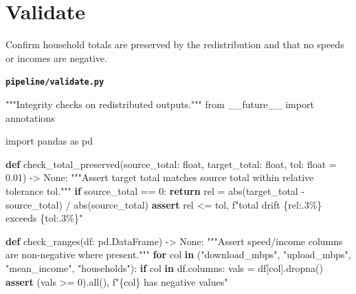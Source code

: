 \documentclass[
  letterpaper,
  DIV=11,
  numbers=noendperiod]{scrreprt}
\newenvironment{Shaded}{\begin{snugshade}}{\end{snugshade}}
\newcommand{\BuiltInTok}[1]{\textcolor[rgb]{0.00,0.23,0.31}{#1}}
\newcommand{\CommentTok}[1]{\textcolor[rgb]{0.37,0.37,0.37}{#1}}
\newcommand{\ControlFlowTok}[1]{\textcolor[rgb]{0.00,0.23,0.31}{\textbf{#1}}}
\newcommand{\DecValTok}[1]{\textcolor[rgb]{0.68,0.00,0.00}{#1}}
\newcommand{\FloatTok}[1]{\textcolor[rgb]{0.68,0.00,0.00}{#1}}
\newcommand{\ImportTok}[1]{\textcolor[rgb]{0.00,0.46,0.62}{#1}}
\newcommand{\KeywordTok}[1]{\textcolor[rgb]{0.00,0.23,0.31}{\textbf{#1}}}
\newcommand{\NormalTok}[1]{\textcolor[rgb]{0.00,0.23,0.31}{#1}}
\newcommand{\OperatorTok}[1]{\textcolor[rgb]{0.37,0.37,0.37}{#1}}
\newcommand{\SpecialCharTok}[1]{\textcolor[rgb]{0.37,0.37,0.37}{#1}}
\newcommand{\SpecialStringTok}[1]{\textcolor[rgb]{0.13,0.47,0.30}{#1}}
\newcommand{\StringTok}[1]{\textcolor[rgb]{0.13,0.47,0.30}{#1}}
\newcommand{\VariableTok}[1]{\textcolor[rgb]{0.07,0.07,0.07}{#1}}
\begin{document}
\section{Validate}\label{validate}

Confirm household totals are preserved by the redistribution and that no
speeds or incomes are negative.

\textbf{\texttt{pipeline/validate.py}}

\begin{Shaded}
\begin{Highlighting}[]
\CommentTok{"""Integrity checks on redistributed outputs."""}
\ImportTok{from}\NormalTok{ \_\_future\_\_ }\ImportTok{import}\NormalTok{ annotations}

\ImportTok{import}\NormalTok{ pandas }\ImportTok{as}\NormalTok{ pd}


\KeywordTok{def}\NormalTok{ check\_total\_preserved(source\_total: }\BuiltInTok{float}\NormalTok{, target\_total: }\BuiltInTok{float}\NormalTok{, tol: }\BuiltInTok{float} \OperatorTok{=} \FloatTok{0.01}\NormalTok{) }\OperatorTok{{-}\textgreater{}} \VariableTok{None}\NormalTok{:}
    \CommentTok{"""Assert target total matches source total within relative tolerance \textasciigrave{}\textasciigrave{}tol\textasciigrave{}\textasciigrave{}."""}
    \ControlFlowTok{if}\NormalTok{ source\_total }\OperatorTok{==} \DecValTok{0}\NormalTok{:}
        \ControlFlowTok{return}
\NormalTok{    rel }\OperatorTok{=} \BuiltInTok{abs}\NormalTok{(target\_total }\OperatorTok{{-}}\NormalTok{ source\_total) }\OperatorTok{/} \BuiltInTok{abs}\NormalTok{(source\_total)}
    \ControlFlowTok{assert}\NormalTok{ rel }\OperatorTok{\textless{}=}\NormalTok{ tol, }\SpecialStringTok{f"total drift }\SpecialCharTok{\{}\NormalTok{rel}\SpecialCharTok{:.3\%\}}\SpecialStringTok{ exceeds }\SpecialCharTok{\{}\NormalTok{tol}\SpecialCharTok{:.3\%\}}\SpecialStringTok{"}


\KeywordTok{def}\NormalTok{ check\_ranges(df: pd.DataFrame) }\OperatorTok{{-}\textgreater{}} \VariableTok{None}\NormalTok{:}
    \CommentTok{"""Assert speed/income columns are non{-}negative where present."""}
    \ControlFlowTok{for}\NormalTok{ col }\KeywordTok{in}\NormalTok{ (}\StringTok{"download\_mbps"}\NormalTok{, }\StringTok{"upload\_mbps"}\NormalTok{, }\StringTok{"mean\_income"}\NormalTok{, }\StringTok{"households"}\NormalTok{):}
        \ControlFlowTok{if}\NormalTok{ col }\KeywordTok{in}\NormalTok{ df.columns:}
\NormalTok{            vals }\OperatorTok{=}\NormalTok{ df[col].dropna()}
            \ControlFlowTok{assert}\NormalTok{ (vals }\OperatorTok{\textgreater{}=} \DecValTok{0}\NormalTok{).}\BuiltInTok{all}\NormalTok{(), }\SpecialStringTok{f"}\SpecialCharTok{\{}\NormalTok{col}\SpecialCharTok{\}}\SpecialStringTok{ has negative values"}



\end{Highlighting}
\end{Shaded}
\end{document}
